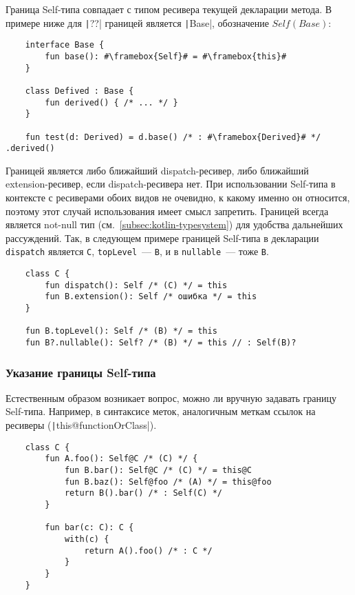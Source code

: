 Граница Self-типа совпадает с типом ресивера текущей декларации метода.
В примере ниже для \texttt|??| границей является \texttt|Base|, обозначение $Self(Base)$:

\begin{verbatim}
    interface Base {
        fun base(): #\framebox{Self}# = #\framebox{this}#
    }

    class Defived : Base {
        fun derived() { /* ... */ }
    }

    fun test(d: Derived) = d.base() /* : #\framebox{Derived}# */ .derived()
\end{verbatim}

Границей является либо ближайший dispatch-ресивер, либо ближайший extension-ресивер, если dispatch-ресивера нет.
При использовании Self-типа в контексте с ресиверами обоих видов не очевидно, к какому именно он относится, поэтому этот случай использования имеет смысл запретить.
Границей всегда является not-null тип (см.~\ref{subsec:kotlin-typesystem}) для удобства дальнейших рассуждений.
Так, в следующем примере границей Self-типа в декларации \texttt{dispatch} является \texttt{C}, \texttt{topLevel}~--- \texttt{B}, и в \texttt{nullable}~--- тоже \texttt{B}.

\begin{verbatim}
    class C {
        fun dispatch(): Self /* (C) */ = this
        fun B.extension(): Self /* ошибка */ = this
    }

    fun B.topLevel(): Self /* (B) */ = this
    fun B?.nullable(): Self? /* (B) */ = this // : Self(B)?
\end{verbatim}

\subsubsection{Указание границы Self-типа}

Естественным образом возникает вопрос, можно ли вручную задавать границу Self-типа.
Например, в синтаксисе меток, аналогичным меткам ссылок на ресиверы (\texttt|this@functionOrClass|).

\begin{verbatim}
    class C {
        fun A.foo(): Self@C /* (C) */ {
            fun B.bar(): Self@C /* (C) */ = this@C
            fun B.baz(): Self@foo /* (A) */ = this@foo
            return B().bar() /* : Self(C) */
        }

        fun bar(c: C): С {
            with(c) {
                return A().foo() /* : C */
            }
        }
    }
\end{verbatim}

